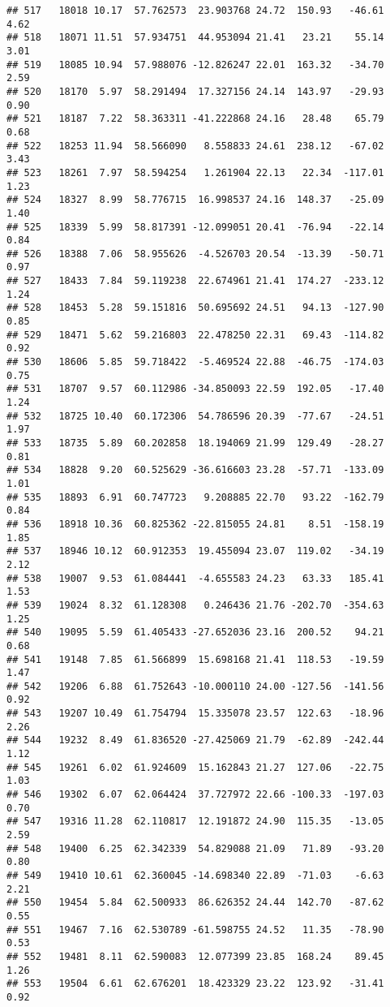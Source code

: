 \documentclass[]{article}
\begin{document}
\begin{verbatim}
## 517   18018 10.17  57.762573  23.903768 24.72  150.93   -46.61  4.62
## 518   18071 11.51  57.934751  44.953094 21.41   23.21    55.14  3.01
## 519   18085 10.94  57.988076 -12.826247 22.01  163.32   -34.70  2.59
## 520   18170  5.97  58.291494  17.327156 24.14  143.97   -29.93  0.90
## 521   18187  7.22  58.363311 -41.222868 24.16   28.48    65.79  0.68
## 522   18253 11.94  58.566090   8.558833 24.61  238.12   -67.02  3.43
## 523   18261  7.97  58.594254   1.261904 22.13   22.34  -117.01  1.23
## 524   18327  8.99  58.776715  16.998537 24.16  148.37   -25.09  1.40
## 525   18339  5.99  58.817391 -12.099051 20.41  -76.94   -22.14  0.84
## 526   18388  7.06  58.955626  -4.526703 20.54  -13.39   -50.71  0.97
## 527   18433  7.84  59.119238  22.674961 21.41  174.27  -233.12  1.24
## 528   18453  5.28  59.151816  50.695692 24.51   94.13  -127.90  0.85
## 529   18471  5.62  59.216803  22.478250 22.31   69.43  -114.82  0.92
## 530   18606  5.85  59.718422  -5.469524 22.88  -46.75  -174.03  0.75
## 531   18707  9.57  60.112986 -34.850093 22.59  192.05   -17.40  1.24
## 532   18725 10.40  60.172306  54.786596 20.39  -77.67   -24.51  1.97
## 533   18735  5.89  60.202858  18.194069 21.99  129.49   -28.27  0.81
## 534   18828  9.20  60.525629 -36.616603 23.28  -57.71  -133.09  1.01
## 535   18893  6.91  60.747723   9.208885 22.70   93.22  -162.79  0.84
## 536   18918 10.36  60.825362 -22.815055 24.81    8.51  -158.19  1.85
## 537   18946 10.12  60.912353  19.455094 23.07  119.02   -34.19  2.12
## 538   19007  9.53  61.084441  -4.655583 24.23   63.33   185.41  1.53
## 539   19024  8.32  61.128308   0.246436 21.76 -202.70  -354.63  1.25
## 540   19095  5.59  61.405433 -27.652036 23.16  200.52    94.21  0.68
## 541   19148  7.85  61.566899  15.698168 21.41  118.53   -19.59  1.47
## 542   19206  6.88  61.752643 -10.000110 24.00 -127.56  -141.56  0.92
## 543   19207 10.49  61.754794  15.335078 23.57  122.63   -18.96  2.26
## 544   19232  8.49  61.836520 -27.425069 21.79  -62.89  -242.44  1.12
## 545   19261  6.02  61.924609  15.162843 21.27  127.06   -22.75  1.03
## 546   19302  6.07  62.064424  37.727972 22.66 -100.33  -197.03  0.70
## 547   19316 11.28  62.110817  12.191872 24.90  115.35   -13.05  2.59
## 548   19400  6.25  62.342339  54.829088 21.09   71.89   -93.20  0.80
## 549   19410 10.61  62.360045 -14.698340 22.89  -71.03    -6.63  2.21
## 550   19454  5.84  62.500933  86.626352 24.44  142.70   -87.62  0.55
## 551   19467  7.16  62.530789 -61.598755 24.52   11.35   -78.90  0.53
## 552   19481  8.11  62.590083  12.077399 23.85  168.24    89.45  1.26
## 553   19504  6.61  62.676201  18.423329 23.22  123.92   -31.41  0.92

\end{verbatim}
\end{document}
